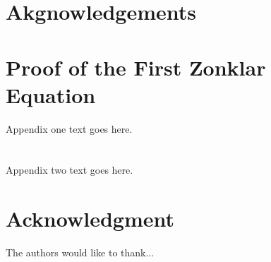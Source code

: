 \documentclass[journal]{IEEEtran}
\begin{document}
\section{Akgnowledgements}






%
\appendices
\section{Proof of the First Zonklar Equation}
Appendix one text goes here.
\section{}
Appendix two text goes here.
\section*{Acknowledgment}
The authors would like to thank...

\printbibliography[title= Referencias, heading=bibintoc]



\end{document}
